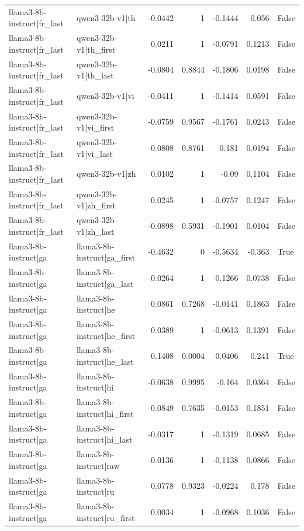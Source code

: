 \begin{table}
\begin{tabular}{l l r r r r l}
llama3-8b-instruct|fr_last & qwen3-32b-v1|th & -0.0442 & 1 & -0.1444 & 0.056 & False \\
llama3-8b-instruct|fr_last & qwen3-32b-v1|th_first & 0.0211 & 1 & -0.0791 & 0.1213 & False \\
llama3-8b-instruct|fr_last & qwen3-32b-v1|th_last & -0.0804 & 0.8844 & -0.1806 & 0.0198 & False \\
llama3-8b-instruct|fr_last & qwen3-32b-v1|vi & -0.0411 & 1 & -0.1414 & 0.0591 & False \\
llama3-8b-instruct|fr_last & qwen3-32b-v1|vi_first & -0.0759 & 0.9567 & -0.1761 & 0.0243 & False \\
llama3-8b-instruct|fr_last & qwen3-32b-v1|vi_last & -0.0808 & 0.8761 & -0.181 & 0.0194 & False \\
llama3-8b-instruct|fr_last & qwen3-32b-v1|zh & 0.0102 & 1 & -0.09 & 0.1104 & False \\
llama3-8b-instruct|fr_last & qwen3-32b-v1|zh_first & 0.0245 & 1 & -0.0757 & 0.1247 & False \\
llama3-8b-instruct|fr_last & qwen3-32b-v1|zh_last & -0.0898 & 0.5931 & -0.1901 & 0.0104 & False \\
llama3-8b-instruct|ga & llama3-8b-instruct|ga_first & -0.4632 & 0 & -0.5634 & -0.363 & True \\
llama3-8b-instruct|ga & llama3-8b-instruct|ga_last & -0.0264 & 1 & -0.1266 & 0.0738 & False \\
llama3-8b-instruct|ga & llama3-8b-instruct|he & 0.0861 & 0.7268 & -0.0141 & 0.1863 & False \\
llama3-8b-instruct|ga & llama3-8b-instruct|he_first & 0.0389 & 1 & -0.0613 & 0.1391 & False \\
llama3-8b-instruct|ga & llama3-8b-instruct|he_last & 0.1408 & 0.0004 & 0.0406 & 0.241 & True \\
llama3-8b-instruct|ga & llama3-8b-instruct|hi & -0.0638 & 0.9995 & -0.164 & 0.0364 & False \\
llama3-8b-instruct|ga & llama3-8b-instruct|hi_first & 0.0849 & 0.7635 & -0.0153 & 0.1851 & False \\
llama3-8b-instruct|ga & llama3-8b-instruct|hi_last & -0.0317 & 1 & -0.1319 & 0.0685 & False \\
llama3-8b-instruct|ga & llama3-8b-instruct|raw & -0.0136 & 1 & -0.1138 & 0.0866 & False \\
llama3-8b-instruct|ga & llama3-8b-instruct|ru & 0.0778 & 0.9323 & -0.0224 & 0.178 & False \\
llama3-8b-instruct|ga & llama3-8b-instruct|ru_first & 0.0034 & 1 & -0.0968 & 0.1036 & False \\

\end{tabular}
\end{table}
